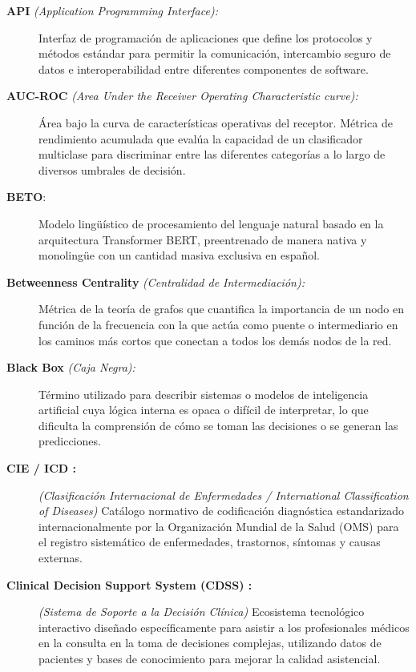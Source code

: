\documentclass[12pt,a4paper,onecolumn,oneside]{report}
\begin{document}
\begin{description}
    \item[\textbf{API} \textit{(Application Programming Interface):}] Interfaz de programación de aplicaciones que define los protocolos y métodos estándar para permitir la comunicación, intercambio seguro de datos e interoperabilidad entre diferentes componentes de software.
    
    \item[\textbf{AUC-ROC} \textit{(Area Under the Receiver Operating Characteristic curve):}] Área bajo la curva de características operativas del receptor. Métrica de rendimiento acumulada que evalúa la capacidad de un clasificador multiclase para discriminar entre las diferentes categorías a lo largo de diversos umbrales de decisión.
    
    \item[\textbf{BETO}:] Modelo lingüístico de procesamiento del lenguaje natural basado en la arquitectura Transformer BERT, preentrenado de manera nativa y monolingüe con un cantidad masiva exclusiva en español.
    
    \item[\textbf{Betweenness Centrality} \textit{(Centralidad de Intermediación):}] Métrica de la teoría de grafos que cuantifica la importancia de un nodo en función de la frecuencia con la que actúa como puente o intermediario en los caminos más cortos que conectan a todos los demás nodos de la red.
    
    \item[\textbf{Black Box} \textit{(Caja Negra):}] Término utilizado para describir sistemas o modelos de inteligencia artificial cuya lógica interna es opaca o difícil de interpretar, lo que dificulta la comprensión de cómo se toman las decisiones o se generan las predicciones.
    
    \item[\textbf{CIE / ICD :}] \textit{(Clasificación Internacional de Enfermedades / International Classification of Diseases)} Catálogo normativo de codificación diagnóstica estandarizado internacionalmente por la Organización Mundial de la Salud (OMS) para el registro sistemático de enfermedades, trastornos, síntomas y causas externas.
    
    \item[\textbf{Clinical Decision Support System (CDSS) :}] \textit{(Sistema de Soporte a la Decisión Clínica)} Ecosistema tecnológico interactivo diseñado específicamente para asistir a los profesionales médicos en la consulta en la toma de decisiones complejas, utilizando datos de pacientes y bases de conocimiento para mejorar la calidad asistencial.
    

\end{description}
\end{document}
